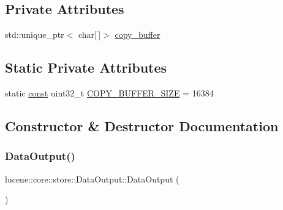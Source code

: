 \subsection*{Private Attributes}
\begin{DoxyCompactItemize}
\item 
std\+::unique\+\_\+ptr$<$ char\mbox{[}$\,$\mbox{]}$>$ \mbox{\hyperlink{classlucene_1_1core_1_1store_1_1DataOutput_a3ef5ff1e43ff4a8e4a2afe35ec13ca4c}{copy\+\_\+buffer}}
\end{DoxyCompactItemize}
\subsection*{Static Private Attributes}
\begin{DoxyCompactItemize}
\item 
static \mbox{\hyperlink{ZlibCrc32_8h_a2c212835823e3c54a8ab6d95c652660e}{const}} uint32\+\_\+t \mbox{\hyperlink{classlucene_1_1core_1_1store_1_1DataOutput_a1886d5be4f9ef158f0e8041a06717aab}{C\+O\+P\+Y\+\_\+\+B\+U\+F\+F\+E\+R\+\_\+\+S\+I\+ZE}} = 16384
\end{DoxyCompactItemize}


\subsection{Constructor \& Destructor Documentation}
\mbox{\label{classlucene_1_1core_1_1store_1_1DataOutput_a0cc6c620951d12812df4f994309ba982}} 
\subsubsection{\texorpdfstring{Data\+Output()}{DataOutput()}}
{\footnotesize\ttfamily lucene\+::core\+::store\+::\+Data\+Output\+::\+Data\+Output (\begin{DoxyParamCaption}{ }\end{DoxyParamCaption})\hspace{0.3cm}{\ttfamily [inline]}}

\mbox{\label{classlucene_1_1core_1_1store_1_1DataOutput_a0b311a60a5a05bc511cd913a702f0390}} 
